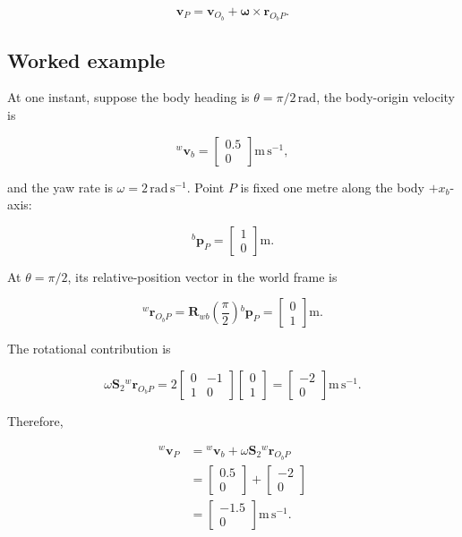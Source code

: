 \documentclass[
  australian,
  12pt,
  letterpaper,
  DIV=11,
  numbers=noendperiod,
  twoside]{scrreprt}
\begin{document}
\[
\mathbf v_P
=
\mathbf v_{O_b}
+
\boldsymbol\omega\times\mathbf r_{O_bP}.
\]

\subsection{Worked example}\label{worked-example-1}

At one instant, suppose the body heading is
\(\theta=\pi/2\,\mathrm{rad}\), the body-origin velocity is

\[
{}^{w}\mathbf v_b
=
\begin{bmatrix}
0.5\\0
\end{bmatrix}
\mathrm{m\,s^{-1}},
\]

and the yaw rate is \(\omega=2\,\mathrm{rad\,s^{-1}}\). Point \(P\) is
fixed one metre along the body \(+x_b\)-axis:

\[
{}^{b}\mathbf p_P
=
\begin{bmatrix}
1\\0
\end{bmatrix}
\mathrm m.
\]

At \(\theta=\pi/2\), its relative-position vector in the world frame is

\[
{}^{w}\mathbf r_{O_bP}
=
\mathbf R_{wb}\left(\frac{\pi}{2}\right){}^{b}\mathbf p_P
=
\begin{bmatrix}
0\\1
\end{bmatrix}
\mathrm m.
\]

The rotational contribution is

\[
\omega\mathbf S_2{}^{w}\mathbf r_{O_bP}
=
2
\begin{bmatrix}
0&-1\\
1&0
\end{bmatrix}
\begin{bmatrix}
0\\1
\end{bmatrix}
=
\begin{bmatrix}
-2\\0
\end{bmatrix}
\mathrm{m\,s^{-1}}.
\]

Therefore,

\[
\begin{aligned}
{}^{w}\mathbf v_P
&=
{}^{w}\mathbf v_b
+
\omega\mathbf S_2{}^{w}\mathbf r_{O_bP}\\
&=
\begin{bmatrix}
0.5\\0
\end{bmatrix}
+
\begin{bmatrix}
-2\\0
\end{bmatrix}\\
&=
\begin{bmatrix}
-1.5\\0
\end{bmatrix}
\mathrm{m\,s^{-1}}.
\end{aligned}
\]
\end{document}
